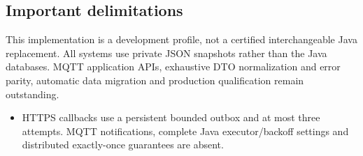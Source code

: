 \documentclass[a4paper]{arrowhead}
\begin{document}
\subsection{Important delimitations}
This implementation is a development profile, not a certified interchangeable Java replacement. All systems use private JSON snapshots rather than the Java databases. MQTT application APIs, exhaustive DTO normalization and error parity, automatic data migration and production qualification remain outstanding.
\begin{itemize}
\item HTTPS callbacks use a persistent bounded outbox and at most three attempts. MQTT notifications, complete Java executor/backoff settings and distributed exactly-once guarantees are absent.
\end{itemize}
\end{document}
